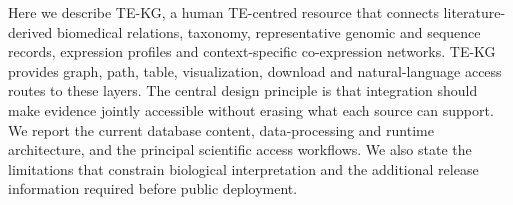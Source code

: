 Here we describe TE-KG, a human TE-centred resource that connects literature-derived biomedical relations, taxonomy, representative genomic and sequence records, expression profiles and context-specific co-expression networks. TE-KG provides graph, path, table, visualization, download and natural-language access routes to these layers. The central design principle is that integration should make evidence jointly accessible without erasing what each source can support. We report the current database content, data-processing and runtime architecture, and the principal scientific access workflows. We also state the limitations that constrain biological interpretation and the additional release information required before public deployment.


